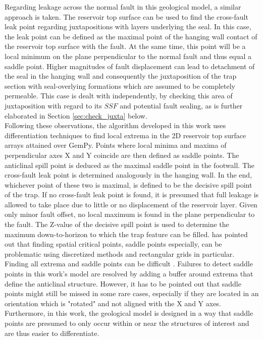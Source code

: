 			Regarding leakage across the normal fault in this geological model, a similar approach is taken. The reservoir top surface can be used to find the cross-fault leak point regarding juxtapositions with layers underlying the seal. In this case, the leak point can be defined as the maximal point of the hanging wall contact of the reservoir top surface with the fault. At the same time, this point will be a local minimum on the plane perpendicular to the normal fault and thus equal a saddle point. Higher magnitudes of fault displacement can lead to detachment of the seal in the hanging wall and consequently the juxtaposition of the trap section with seal-overlying formations which are assumed to be completely permeable. This case is dealt with independently, by checking this area of juxtaposition with regard to its $SSF$ and potential fault sealing, as is further elaborated in Section \ref{sec:check_juxta} below.\\
			Following these observations, the algorithm developed in this work uses differentiation techniques to find local extrema in the 2D reservoir top surface arrays attained over GemPy. Points where local minima and maxima of perpendicular axes X and Y coincide are then defined as saddle points. The anticlinal spill point is deduced as the maximal saddle point in the footwall. The cross-fault leak point is determined analogously in the hanging wall. In the end, whichever point of these two is maximal, is defined to be the decisive spill point of the trap. If no cross-fault leak point is found, it is presumed that full leakage is allowed to take place due to little or no displacement of the reservoir layer. Given only minor fault offset, no local maximum is found in the plane perpendicular to the fault. The Z-value of the decisive spill point is used to determine the maximum down-to-horizon to which the trap feature can be filled.
			\citet{kuijper2004detecting} has pointed out that finding spatial critical points, saddle points especially, can be problematic using discretized methods and rectangular grids in particular. Finding all extrema and saddle points can be difficult \citep{kuijper2004detecting}. Failures to detect saddle points in this work's model are resolved by adding a buffer around extrema that define the anticlinal structure. However, it has to be pointed out that saddle points might still be missed in some rare cases, especially if they are located in an orientation which is "rotated" and not aligned with the X and Y axes. Furthermore, in this work, the geological model is designed in a way that saddle points are presumed to only occur within or near the structures of interest and are thus easier to differentiate.
						
